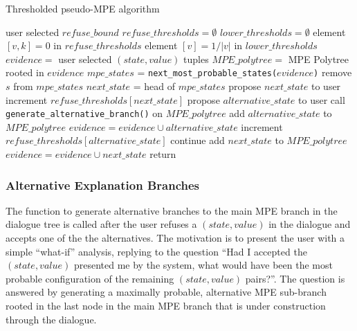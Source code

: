 \begin{algorithm}[htp!]
	\caption{Thresholded pseudo-MPE algorithm}
	\label{alg:pseudo-mpe-thresholded}
	\begin{algorithmic}[1]
		\State user selected $refuse\_bound$
		\State $refuse\_thresholds = \emptyset$
		\State $lower\_thresholds = \emptyset$
				\State element $[v,k]=0$ in $refuse\_thresholds$
			\EndFor
			\State element $[v]=1 / |v|$ in $lower\_thresholds$ 
		\EndFor
		\State $evidence = $ user selected $(state,value)$ tuples
		\State $MPE\_polytree = $ MPE Polytree rooted in $evidence$
		\State $mpe\_states$ = \texttt{next\_most\_probable\_states($evidence$)}
					\State remove $s$ from $mpe\_states$ 
				\EndIf
			\EndFor		
				\State $next\_state$ = head of $mpe\_states$ 
				\State propose $next\_state$ to user 
					\State increment $refuse\_thresholds[next\_state]$
						\State propose $alternative\_state$ to user 
							\State call \texttt{generate\_alternative\_branch()} on $MPE\_polytree$ 
							\State add $alternative\_state$ to $MPE\_polytree$
							\State $evidence = evidence \cup alternative\_state$
						\Else
							\State increment $refuse\_thresholds[alternative\_state]$
							\State continue
						\EndIf
					\EndFor
				\Else
					\State add $next\_state$ to $MPE\_polytree$
					\State $evidence = evidence \cup next\_state$
				\EndIf
			\Else 
				\State return
			\EndIf
		\EndWhile
	\end{algorithmic}
\end{algorithm} 

\subsubsection{Alternative Explanation Branches}
The function to generate alternative branches to the main MPE branch in the dialogue tree is called after the user refuses a $(state,value)$ in the dialogue and accepts one of the the alternatives.
The motivation is to present the user with a simple \enquote{what-if} analysis, replying to the question \enquote{Had I accepted the $(state,value)$ presented me by the system, what would have been the most probable configuration of the remaining $(state,value)$ pairs?}.
The question is answered by generating a maximally probable, alternative MPE sub-branch rooted in the last node in the main MPE branch that is under construction through the dialogue.

